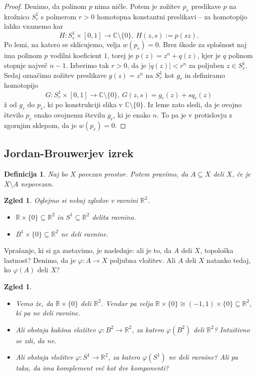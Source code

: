 \documentclass[10pt, a4paper]{article}
\newtheorem{defi}[izr]{Definicija}
\newenvironment{noticeB}{%
  \tcolorbox[%
  notitle,
  empty,
  enhanced,  %
  breakable,
  coltext=black,
  colback=white, 
  fontupper=\rmfamily,
  parbox=false,
  noparskip,
  sharp corners,
  boxrule=-1pt,  %
  frame hidden,
  left=7pt,  %
  right=7pt,
  top=5pt,
  bottom=5pt,
  before skip=2.5ex plus 2pt,
  after skip=2.5ex plus 2pt,
  borderline west = {1.5pt}{-0.1pt}{blue!30!black}, %
  overlay unbroken and last={%
    \draw[color=black, line width=1.25pt]
    ($(frame.south west)+(1.pt, -0.1pt)$) -- ++(2em, 0);
  }
  ]}
{\endtcolorbox}
\newenvironment{definicija}{\begin{defi}\begin{noticeB}}{%
    \end{noticeB}\end{defi}}
\newtheorem{zgled}[izr]{Zgled}
\newenvironment{noticeC}{%
  \tcolorbox[%
  notitle,
  empty,
  enhanced,  %
  breakable,
  coltext=black, 
  fontupper=\rmfamily,
  parbox=false,
  noparskip,
  sharp corners,
  boxrule=-1pt,  %
  frame hidden,
  left=7pt,  %
  right=7pt,
  top=5pt,
  bottom=5pt,
  before skip=2.5ex plus 2pt,
  after skip=2.5ex plus 2pt,
  overlay unbroken and last={%
  },
  ]}
{\endtcolorbox}
\newenvironment{dokaz}%
  {\begin{noticeC}\begin{proof}}%
  {\end{proof}\end{noticeC}}
\newcommand{\R}{\mathbb {R}}
\newcommand{\C}{\mathbb {C}}
\begin{document}
\begin{dokaz}
  Denimo, da polinom $p$ nima ničle. Potem je zožitev $p_r$ preslikave $p$ 
  na krožnico $S_r^1$ s polmerom $r > 0$ homotopna konstantni preslikavi -- za homotopijo 
  lahko vzamemo kar $$H: S_r ^1 \times [0, 1] \to \C \setminus \{0\},\ H(z, s) := p(sz).$$
  Po lemi, na katero se sklicujemo, velja $w(p_r) = 0.$
  Brez škode za splošnost naj ima polinom $p$ vodilni koeficient $1$, torej je 
  $p(z) = z^n + q(z)$, kjer je $q$ polinom stopnje največ $n - 1$.
  Izberimo tak $r > 0$, da je $|q(z)| < r^n$ za poljuben $z \in S^1 _r$.
  Sedaj označimo zožitev preslikave $g(z) = z^n$ na $S^1 _r$ kot $g_r$ in definiramo homotopijo 
  $$G: S_r ^1 \times [0, 1] \to \C \setminus \{0\},\ G(z, s) = g_r (z) + s q_r(z)$$ ž
  od $g_r$ do $p_r$, ki po konstrukciji slika v $\C \setminus \{0\}$.
  Iz leme zato sledi, da je ovojno število $p_r$ enako ovojnemu številu $g_r$, ki je enako $n$.
  To pa je v protislovju z zgornjim sklepom, da je $w(p_r) = 0.$
\end{dokaz}

\subsection{Jordan-Brouwerjev izrek}

\begin{definicija}
  Naj bo $X$ povezan prostor. Potem pravimo, da $A \subseteq X$ deli $X$,
  če je $X \setminus A$ nepovezan.
\end{definicija}

\begin{zgled}
  Oglejmo si nekaj zgledov v ravnini $\R^2$.
  \begin{itemize}
    \item $\R \times \{0\} \subseteq \R^2$ in $S^1 \subseteq \R^2$ delita ravnino.
    \item $B^1 \times \{0\} \subseteq \R^2$ ne deli ravnine.
  \end{itemize}
\end{zgled}

Vprašanje, ki si ga zastavimo, je naslednje: ali je to, da $A$ deli $X$, topološka lastnost?
Denimo, da je $\varphi: A \to X$ poljubna vložitev. Ali $A$ deli $X$ natanko tedaj, ko 
$\varphi(A)$ deli $X$?

\begin{zgled}
  \begin{itemize}
    \item Vemo že, da $\R \times \{0\}$ deli $\R^2$. 
    Vendar pa velja $\R \times \{0\} \cong (-1, 1) \times \{0\} \subseteq \R^2$,
    ki pa ne deli ravnine.
    \item Ali obstaja kakšna vložitev $\varphi: B^2 \to \R^2$, za katero 
    $\varphi (B^2)$ deli $\R^2$? Intuitivno se zdi, da ne.
    \item Ali obstaja vložitev $\varphi: S^1 \to \R^2$, za katero $\varphi (S^1)$
    ne deli ravnine? Ali pa taka, da ima komplement več kot dve komponenti?
  \end{itemize}
\end{zgled}
\end{document}
